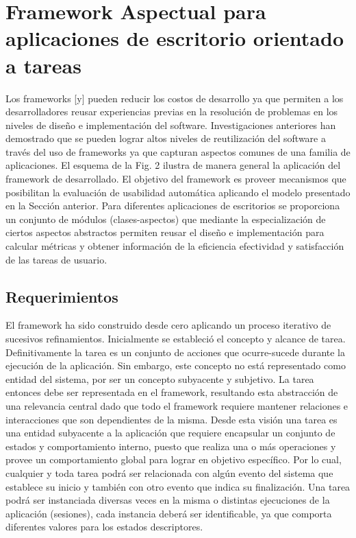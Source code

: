 \section{Framework Aspectual para aplicaciones de escritorio orientado a tareas}
\label{sec:framework_aspectual}

Los frameworks [y] pueden reducir los costos de desarrollo ya que permiten a los desarrolladores reusar experiencias previas en la resolución de problemas en los niveles de diseño e implementación del software. Investigaciones anteriores han demostrado que se pueden lograr altos niveles de reutilización del software a través del uso de frameworks ya que capturan aspectos comunes de una familia de aplicaciones. 
El esquema de la Fig. 2 ilustra de manera general la aplicación del framework de desarrollado. El objetivo del framework es proveer mecanismos que posibilitan la evaluación de usabilidad automática aplicando el modelo presentado en la Sección anterior. Para diferentes aplicaciones de escritorios se proporciona un conjunto de módulos (clases-aspectos) que mediante la especialización de ciertos aspectos abstractos permiten reusar el diseño e implementación para calcular métricas y obtener información de la eficiencia efectividad y satisfacción de las tareas de usuario.


\subsection{Requerimientos}
\label{subsec:requerimientos}
El framework ha sido construido desde cero aplicando un proceso iterativo de sucesivos refinamientos. Inicialmente se estableció el concepto y alcance de tarea. Definitivamente la tarea es un conjunto de acciones que ocurre-sucede durante la ejecución de la aplicación. Sin embargo, este concepto no está representado como entidad del sistema, por ser un concepto subyacente y subjetivo. La tarea entonces debe ser representada en el framework, resultando esta abstracción de una relevancia central dado que todo el framework requiere mantener relaciones e interacciones que son dependientes de la misma. Desde esta visión una  tarea es una entidad subyacente a la aplicación que requiere encapsular un conjunto de estados y comportamiento interno,  puesto que realiza una o más operaciones y provee un comportamiento global para lograr en objetivo específico. Por lo cual, cualquier y toda tarea podrá ser relacionada con algún evento del sistema que establece su inicio y también con otro evento que indica su finalización. Una tarea podrá ser instanciada diversas veces en la misma o distintas ejecuciones de la aplicación (sesiones), cada instancia deberá ser identificable, ya que comporta diferentes valores para los estados descriptores. 

